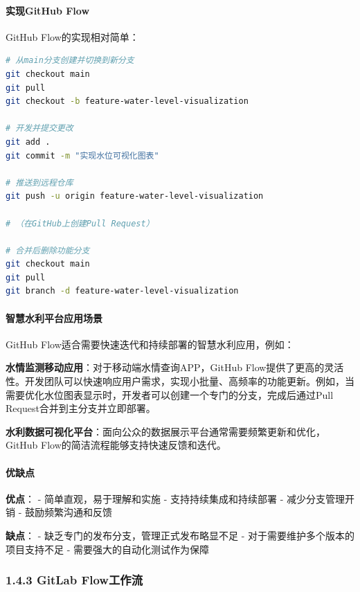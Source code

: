 \paragraph{实现GitHub Flow}\label{ux5b9eux73b0github-flow}

GitHub Flow的实现相对简单：

\begin{lstlisting}[language=bash]
# 从main分支创建并切换到新分支
git checkout main
git pull
git checkout -b feature-water-level-visualization

# 开发并提交更改
git add .
git commit -m "实现水位可视化图表"

# 推送到远程仓库
git push -u origin feature-water-level-visualization

# （在GitHub上创建Pull Request）

# 合并后删除功能分支
git checkout main
git pull
git branch -d feature-water-level-visualization
\end{lstlisting}

\paragraph{智慧水利平台应用场景}\label{ux667aux6167ux6c34ux5229ux5e73ux53f0ux5e94ux7528ux573aux666f-1}

GitHub Flow适合需要快速迭代和持续部署的智慧水利应用，例如：

\textbf{水情监测移动应用}：对于移动端水情查询APP，GitHub
Flow提供了更高的灵活性。开发团队可以快速响应用户需求，实现小批量、高频率的功能更新。例如，当需要优化水位图表显示时，开发者可以创建一个专门的分支，完成后通过Pull
Request合并到主分支并立即部署。

\textbf{水利数据可视化平台}：面向公众的数据展示平台通常需要频繁更新和优化，GitHub
Flow的简洁流程能够支持快速反馈和迭代。

\paragraph{优缺点}\label{ux4f18ux7f3aux70b9-1}

\textbf{优点}： - 简单直观，易于理解和实施 - 支持持续集成和持续部署 -
减少分支管理开销 - 鼓励频繁沟通和反馈

\textbf{缺点}： - 缺乏专门的发布分支，管理正式发布略显不足 -
对于需要维护多个版本的项目支持不足 - 需要强大的自动化测试作为保障

\subsubsection{1.4.3 GitLab
Flow工作流}\label{gitlab-flowux5de5ux4f5cux6d41}

